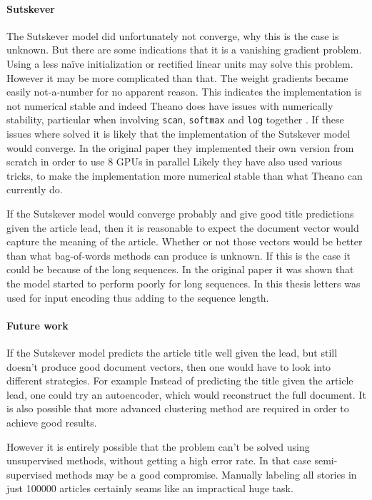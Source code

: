 \paragraph{Sutskever} The Sutskever model did unfortunately not converge, why this is the case is unknown. But there are some indications that it is a vanishing gradient problem. Using a less naïve initialization or rectified linear units may solve this problem. However it may be more complicated than that. The weight gradients became easily not-a-number for no apparent reason. This indicates the implementation is not numerical stable and indeed Theano does have issues with numerically stability, particular when involving \texttt{scan}, \texttt{softmax} and \texttt{log} together \cite{theano-issue}. If these issues where solved it is likely that the implementation of the Sutskever model would converge. In the original paper \cite{sutskever} they implemented their own version from scratch in order to use 8 GPUs in parallel Likely they have also used various tricks, to make the implementation more numerical stable than what Theano can currently do.

If the Sutskever model would converge probably and give good title predictions given the article lead, then it is reasonable to expect the document vector would capture the meaning of the article. Whether or not those vectors would be better than what bag-of-words methods can produce is unknown. If this is the case it could be because of the long sequences. In the original paper \cite{sutskever} it was shown that the model started to perform poorly for long sequences. In this thesis letters was used for input encoding thus adding to the sequence length.

\paragraph{Future work} If the Sutskever model predicts the article title well given the lead, but still doesn't produce good document vectors, then one would have to look into different strategies. For example Instead of predicting the title given the article lead, one could try an autoencoder, which would reconstruct the full document. It is also possible that more advanced clustering method are required in order to achieve good results.

However it is entirely possible that the problem can't be solved using unsupervised methods, without getting a high error rate. In that case semi-supervised methods may be a good compromise. Manually labeling all stories in just 100000 articles certainly seams like an impractical huge task.
 